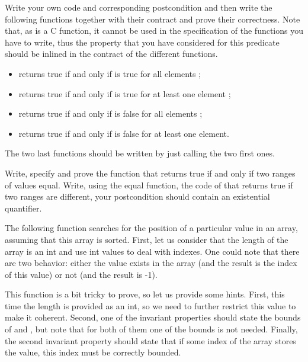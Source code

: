 Write your own code and corresponding postcondition and then write the
following functions together with their contract and prove their correctness.
Note that, as  is a C function, it cannot be used in the
specification of the functions you have to write, thus the property that you
have considered for this predicate should be inlined in the contract of the
different functions.


\begin{itemize}
\item {} returns true if and only if 
  is true for all elements ;
\item {} returns true if and only if 
  is true for at least one element ;
\item {} returns true if and only if 
  is false for all elements ;
\item {} returns true if and only if 
  is false for at least one element.
\end{itemize}


The two last functions should be written by just calling the two first ones.




Write, specify and prove the function  that returns true if
and only if two ranges of values equal. Write, using the equal function, the
code of  that returns true if two ranges are different,
your postcondition should contain an existential quantifier.




\label{l4:statements-loops-ex-bsearch}


The following function searches for the position of a particular value in an
array, assuming that this array is sorted. First, let us consider that the
length of the array is an int and use int values to deal with indexes. One
could note that there are two behavior: either the value exists in the array
(and the result is the index of this value) or not (and the result is -1).




This function is a bit tricky to prove, so let us provide some hints. First,
this time the length is provided as an int, so we need to further restrict
this value to make it coherent. Second, one of the invariant properties
should state the bounds of  and , but note
that for both of them one of the bounds is not needed. Finally, the second
invariant property should state that if some index of the array stores the
value, this index must be correctly bounded.


